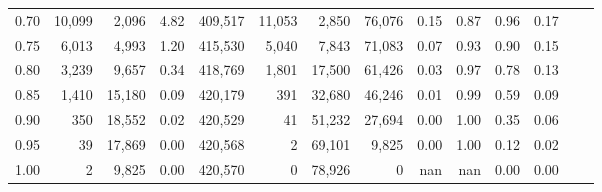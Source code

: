 \begin{tabular}{rrrrrrrrrrrrrr}
0.70 &  10,099 &   2,096 &      4.82 &  409,517 &   11,053 &   2,850 &  76,076 &  0.15 &  0.87 &  0.96 &      0.17 \\
0.75 &   6,013 &   4,993 &      1.20 &  415,530 &    5,040 &   7,843 &  71,083 &  0.07 &  0.93 &  0.90 &      0.15 \\
0.80 &   3,239 &   9,657 &      0.34 &  418,769 &    1,801 &  17,500 &  61,426 &  0.03 &  0.97 &  0.78 &      0.13 \\
0.85 &   1,410 &  15,180 &      0.09 &  420,179 &      391 &  32,680 &  46,246 &  0.01 &  0.99 &  0.59 &      0.09 \\
0.90 &     350 &  18,552 &      0.02 &  420,529 &       41 &  51,232 &  27,694 &  0.00 &  1.00 &  0.35 &      0.06 \\
0.95 &      39 &  17,869 &      0.00 &  420,568 &        2 &  69,101 &   9,825 &  0.00 &  1.00 &  0.12 &      0.02 \\
1.00 &       2 &   9,825 &      0.00 &  420,570 &        0 &  78,926 &       0 &   nan &   nan &  0.00 &      0.00 \\
\bottomrule
\end{tabular}
